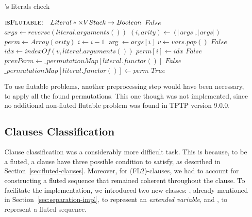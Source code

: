 \begin{algorithm}[H]
  \caption{'s literals check}\label{alg:formula-classifier-literals-flutable}
  \begin{algorithmic}[1]
      \Statex{}  \(\textsc{isFlutable:} \quad Literal* \times VStack\to Boolean\)
            \State{} \Return{} \(False\)
          \EndIf{}
          \State{} \(args \gets reverse(literal.arguments())\)
          \State{} \((i,arity) \gets (|args|,|args|)\)
          \State{} \(perm \gets Array(arity)\)
              \State{} \(i \gets i - 1\)
              \State{} \(\arg \gets args[i]\)
              \State{} \(v \gets vars.pop()\)
                  \State{} \Return{} \(False\)
              \EndIf{}
              \State{} \(idx \gets indexOf(v, literal.arguments())\)
              \State{} \(perm[i] \gets idx\)
          \EndWhile{}
            \State{} \Return{} \(False\)
          \EndIf{}
          \State{} \(prevPerm \gets \_permutationMap[literal.functor()]\)
              \State{} \Return{} \(False\)
            \EndIf{}
          \Else{}
            \State{} \(\_permutationMap[literal.functor()] \gets perm\)
          \EndIf{}
          \State{} \Return{} \(True\)
      \EndFunction{}
  \end{algorithmic}
\end{algorithm}

To use flutable problems, another preprocessing step would have been necessary, to apply all the found permutations.
This one though was not implemented, since no additional non-fluted flutable problem was found in TPTP version 9.0.0.

\subsection{Clauses Classification}\label{subsec:clauses-classification}

Clause classification was a considerably more difficult task. This is because, to be a fluted, a clause have three possible condition to satisfy, as described in Section~\ref{sec:fluted-clauses}.
Moreover, for (FL2)-clauses, we had to account for constructing a fluted sequence that remained coherent throughout the clause.
To facilitate the implementation, we introduced two new classes: , already mentioned in Section~\ref{sec:separation-impl}, to represent an \emph{extended variable}, and , to represent a fluted sequence.

